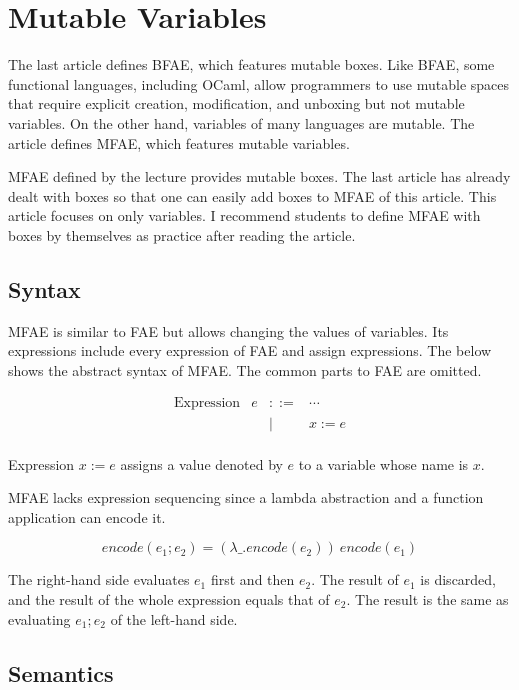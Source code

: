 \setchapterpreamble[u]{\margintoc}
\chapter{Mutable Variables}

The last article defines BFAE, which features mutable boxes. Like BFAE, some functional languages, including OCaml, allow programmers to use mutable spaces that require explicit creation, modification, and unboxing but not mutable variables. On the other hand, variables of many languages are mutable. The article defines MFAE, which features mutable variables.

MFAE defined by the lecture provides mutable boxes. The last article has already dealt with boxes so that one can easily add boxes to MFAE of this article. This article focuses on only variables. I recommend students to define MFAE with boxes by themselves as practice after reading the article.

\section{Syntax}

MFAE is similar to FAE but allows changing the values of variables. Its expressions include every expression of FAE and assign expressions. The below shows the abstract syntax of MFAE. The common parts to FAE are omitted.

\[
\begin{array}{lrcl}
\text{Expression} & e & ::= & \cdots \\
&& | & x:=e \\
\end{array}
\]

Expression \(x:=e\) assigns a value denoted by \(e\) to a variable whose name is \(x\).

MFAE lacks expression sequencing since a lambda abstraction and a function application can encode it.


\[\mathit{encode}(e_1;e_2)=(\lambda \_ . \mathit{encode}(e_2))\ \mathit{encode}(e_1)\]

The right-hand side evaluates \(e_1\) first and then \(e_2\). The result of \(e_1\) is discarded, and the result of the whole expression equals that of \(e_2\). The result is the same as evaluating \(e_1;e_2\) of the left-hand side.

\section{Semantics}


